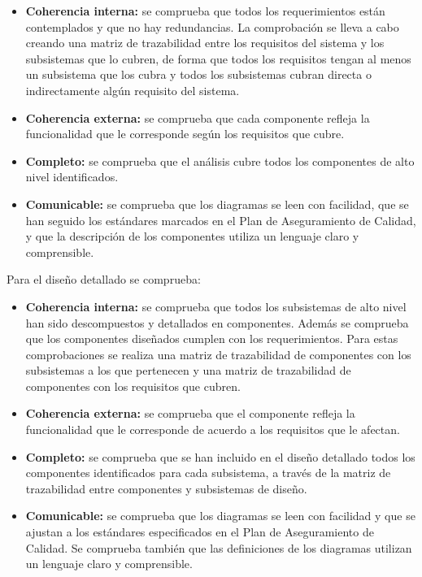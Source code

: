 \begin{itemize}[-]
  \item \textbf{Coherencia interna:} se comprueba que todos los requerimientos están contemplados y que no hay redundancias. La comprobación se lleva a cabo creando una matriz de trazabilidad entre los requisitos del sistema y los subsistemas que lo cubren, de forma que todos los requisitos tengan al menos un subsistema que los cubra y todos los subsistemas cubran directa o indirectamente algún requisito del sistema.
  \item \textbf{Coherencia externa:} se comprueba que cada componente refleja la funcionalidad que le corresponde según los requisitos que cubre.
  \item \textbf{Completo:} se comprueba que el análisis cubre todos los componentes de alto nivel identificados.
  \item \textbf{Comunicable:} se comprueba que los diagramas se leen con facilidad, que se han seguido los estándares marcados en el Plan de Aseguramiento de Calidad, y que la descripción de los componentes utiliza un lenguaje claro y comprensible.
\end{itemize}

\par Para el diseño detallado se comprueba:

\begin{itemize}[-]
  \item \textbf{Coherencia interna:} se comprueba que todos los subsistemas de alto nivel han sido descompuestos y detallados en componentes. Además se comprueba que los componentes diseñados cumplen con los requerimientos. Para estas comprobaciones se realiza una matriz de trazabilidad de componentes con los subsistemas a los que pertenecen y una matriz de trazabilidad de componentes con los requisitos que cubren.
  \item \textbf{Coherencia externa:} se comprueba que el componente refleja la funcionalidad que le corresponde de acuerdo a los requisitos que le afectan.
  \item \textbf{Completo:} se comprueba que se han incluido en el diseño detallado todos los componentes identificados para cada subsistema, a través de la matriz de trazabilidad entre componentes y subsistemas de diseño.
  \item \textbf{Comunicable:} se comprueba que los diagramas se leen con facilidad y que se ajustan a los estándares especificados en el Plan de Aseguramiento de Calidad. Se comprueba también que las definiciones de los diagramas utilizan un lenguaje claro y comprensible.
\end{itemize}

